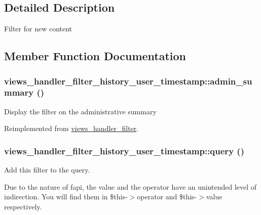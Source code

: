 \subsection{Detailed Description}
Filter for new content 

\subsection{Member Function Documentation}
\hypertarget{classviews__handler__filter__history__user__timestamp_a5eeead15fcc3d6e74ca62c31676e109}{
\subsubsection[{admin\_\-summary}]{\setlength{\rightskip}{0pt plus 5cm}views\_\-handler\_\-filter\_\-history\_\-user\_\-timestamp::admin\_\-summary ()}}
\label{classviews__handler__filter__history__user__timestamp_a5eeead15fcc3d6e74ca62c31676e109}


Display the filter on the administrative summary 

Reimplemented from \hyperlink{classviews__handler__filter_655263cd0b73188eec064b9a9743fe4c}{views\_\-handler\_\-filter}.\hypertarget{classviews__handler__filter__history__user__timestamp_c7499e60ca61853a3cd37fcbaa3c0618}{
\subsubsection[{query}]{\setlength{\rightskip}{0pt plus 5cm}views\_\-handler\_\-filter\_\-history\_\-user\_\-timestamp::query ()}}
\label{classviews__handler__filter__history__user__timestamp_c7499e60ca61853a3cd37fcbaa3c0618}


Add this filter to the query.

Due to the nature of fapi, the value and the operator have an unintended level of indirection. You will find them in \$this-$>$operator and \$this-$>$value respectively. 

